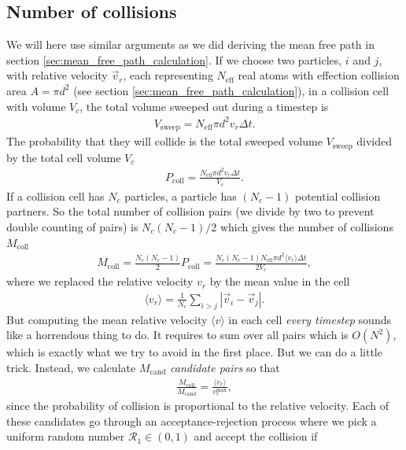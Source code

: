 \subsection{Number of collisions}
We will here use similar arguments as we did deriving the mean free path in section \ref{sec:mean_free_path_calculation}. If we choose two particles, $i$ and $j$, with relative velocity $\vec v_r$, each representing $N_\text{eff}$ real atoms with effection collision area $A=\pi d^2$ (see section \ref{sec:mean_free_path_calculation}), in a collision cell with volume $V_c$, the total volume sweeped out during a timestep is
\begin{align}
	V_\text{sweep} = N_\text{eff}\pi d^2v_r\Delta t.
\end{align}
The probability that they will collide is the total sweeped volume $V_\text{sweep}$ divided by the total cell volume $V_c$
\begin{align}
	P_\text{coll} = \frac{N_\text{eff}\pi d^2 v_r\Delta t}{ V_c}.
\end{align}
If a collision cell has $N_c$ particles, a particle has $(N_c-1)$ potential collision partners. So the total number of collision pairs (we divide by two to prevent double counting of pairs) is $N_c(N_c-1)/2$ which gives the number of collisions $M_\text{coll}$
\begin{align}
	\label{eq:dsmc_number_of_collisions}
	M_\text{coll} = \frac{N_c(N_c-1)}{2}P_\text{coll} = \frac{N_c(N_c-1)N_\text{eff}\pi d^2\langle v_r \rangle \Delta t}{2 V_c},
\end{align}
where we replaced the relative velocity $v_r$ by the mean value in the cell
\begin{align}
	\langle v_r \rangle = \frac{1}{N_c} \sum_{i>j} |\vec v_i - \vec v_j|.
\end{align}
But computing the mean relative velocity $\langle v \rangle$ in each cell \textit{every timestep} sounds like a horrendous thing to do. It requires to sum over all pairs which is $O(N^2)$, which is exactly what we try to avoid in the first place. But we can do a little trick. Instead, we calculate $M_\text{cand}$ \textit{candidate pairs} so that
\begin{align}
	\frac{M_\text{coll}}{M_\text{cand}} = \frac{\langle v_r\rangle}{v_r^\text{max}},
\end{align}
since the probability of collision is proportional to the relative velocity. Each of these candidates go through an acceptance-rejection process where we pick a uniform random number $\mathcal{R}_1\in (0,1)$ and accept the collision if
